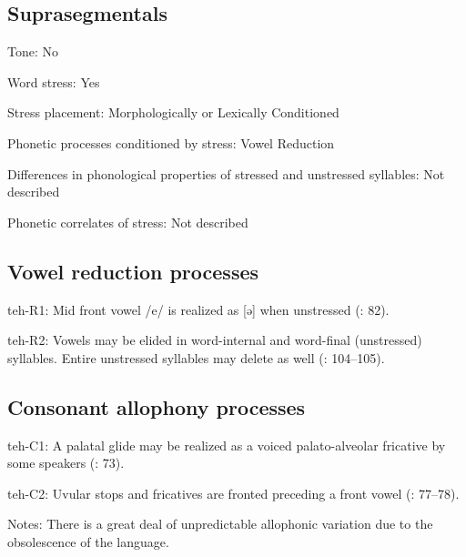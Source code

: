 {\subsection*{Suprasegmentals}
\begin{appendixdesc}
\item[Tone:] No

\item[Word stress:] Yes

\item[Stress placement:] Morphologically or Lexically Conditioned

\item[Phonetic processes conditioned by stress:] Vowel Reduction

\item[Differences in phonological properties of stressed and unstressed syllables:] Not described

\item[Phonetic correlates of stress:] Not described
\end{appendixdesc}
\subsection*{Vowel reduction processes}
\begin{appendixdesc}

\item[teh-R1:] Mid front vowel /e/ is realized as [ə] when unstressed (\citealt{FernándezGaray1998}: 82).

\item[teh-R2:] Vowels may be elided in word-internal and word-final (unstressed) syllables. Entire unstressed syllables may delete as well (\citealt{FernándezGaray1998}: 104--105).
\end{appendixdesc}
\subsection*{Consonant allophony processes}
\begin{appendixdesc}

\item[teh-C1:] A palatal glide may be realized as a voiced palato-alveolar fricative by some speakers (\citealt{FernándezGaray1998}: 73).

\item[teh-C2:] Uvular stops and fricatives are fronted preceding a front vowel (\citealt{FernándezGaray1998}: 77--78).

\item[Notes:] There is a great deal of unpredictable allophonic variation due to the obsolescence of the language.
\end{appendixdesc}
}
